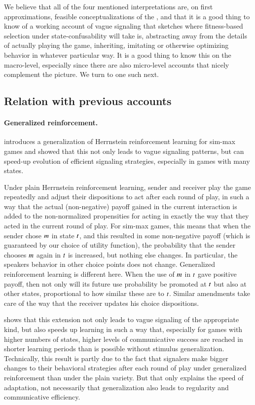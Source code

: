 We believe that all of the four mentioned interpretations are, on
first approximations, feasible conceptualizations of the \rdd, and
that it is a good thing to know of a working account of vague
signaling that sketches where fitness-based selection under
state-confusability will take is, abstracting away from the details of
actually playing the game, inheriting, imitating or otherwise
optimizing behavior in whatever particular way. It is a good thing to
know this on the macro-level, especially since there are also
micro-level accounts that nicely complement the picture. We turn to
one such next.


\subsection{Relation with previous accounts}
\label{sec:relat-with-prev}

\paragraph{Generalized reinforcement.}
\citet{OConnor2013:The-Evolution-o} introduces a generalization of
Herrnstein reinforcement learning for sim-max games and showed that
this not only leads to vague signaling patterns, but can speed-up
evolution of efficient signaling strategies, especially in games with
many states. 

Under plain Herrnstein reinforcement learning, sender and receiver
play the game repeatedly and adjust their dispositions to act after
each round of play, in such a way that the actual (non-negative)
payoff gained in the current interaction is added to the
non-normalized propensities for acting in exactly the way that they
acted in the current round of play. For sim-max games, this means that
when the sender chose $m$ in state $t$, and this resulted in
some non-negative payoff (which is guaranteed by our choice of utility
function), the probability that the sender chooses $m$ again in
$t$ is increased, but nothing else changes. In particular, the
speakers behavior in other choice points does not change. Generalized
reinforcement learning is different here. When the use of $m$ in
$t$ gave positive payoff, then not only will its future use
probability be promoted at $t$ but also at other states,
proportional to how similar these are to $t$. Similar amendments
take care of the way that the receiver updates his choice
dispositions.

\citet{OConnor2013:The-Evolution-o} shows that this extension not only
leads to vague signaling of the appropriate kind, but also speeds up
learning in such a way that, especially for games with higher numbers
of states, higher levels of communicative success are reached in
shorter learning periods than is possible without stimulus
generalization. Technically, this result is partly due to the fact
that signalers make bigger changes to their behavioral strategies
after each round of play under generalized reinforcement than under
the plain variety. But that only explains the speed of adaptation, not
necessarily that generalization also leads to regularity and
communicative efficiency. 

